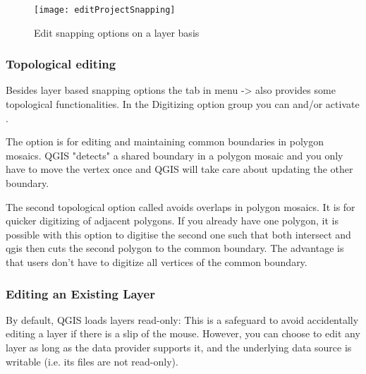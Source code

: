 \begin{figure}[H]
   \begin{center}
   \caption{Edit snapping options on a layer basis \nixcaption}\label{fig:snappingoptions}\smallskip
   \texttt{[image: editProjectSnapping]} 
\end{center}  
\end{figure}

\subsubsection{Topological editing}

Besides layer based snapping options the  tab in menu 
 ->  
also provides some topological functionalities. 
In the Digitizing option group you can  and/or activate 
.


The option  is for editing and maintaining 
common boundaries in polygon mosaics. QGIS "detects" a shared boundary in 
a polygon mosaic and you only have to move the vertex once and QGIS will take 
care about updating the other boundary.


The second topological option called  
avoids overlaps in polygon mosaics. It is for quicker digitizing of adjacent polygons. 
If you already have one polygon, it is possible with this option to digitise the second 
one such that both intersect and qgis then cuts the second polygon to the common boundary. 
The advantage is that users don't have to digitize all vertices of the common boundary.

\subsubsection{Editing an Existing Layer}
\label{sec:edit_existing_layer}

By default, QGIS loads layers read-only: This is a safeguard
to avoid accidentally editing a layer if there is a slip of the mouse.
However, you can choose to edit any layer as long as the data provider supports it,
and the underlying data source is writable (i.e. its files are not read-only).

